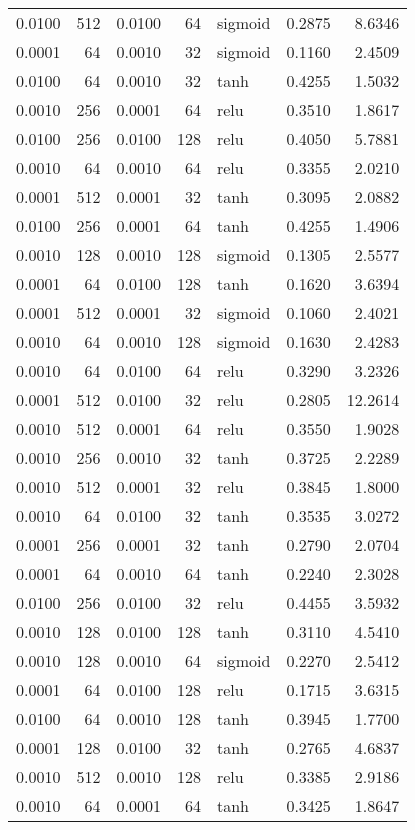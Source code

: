 \begin{table}
\begin{tabular}{rrrrlrr}
0.0100 & 512 & 0.0100 & 64 & sigmoid & 0.2875 & 8.6346 \\
0.0001 & 64 & 0.0010 & 32 & sigmoid & 0.1160 & 2.4509 \\
0.0100 & 64 & 0.0010 & 32 & tanh & 0.4255 & 1.5032 \\
0.0010 & 256 & 0.0001 & 64 & relu & 0.3510 & 1.8617 \\
0.0100 & 256 & 0.0100 & 128 & relu & 0.4050 & 5.7881 \\
0.0010 & 64 & 0.0010 & 64 & relu & 0.3355 & 2.0210 \\
0.0001 & 512 & 0.0001 & 32 & tanh & 0.3095 & 2.0882 \\
0.0100 & 256 & 0.0001 & 64 & tanh & 0.4255 & 1.4906 \\
0.0010 & 128 & 0.0010 & 128 & sigmoid & 0.1305 & 2.5577 \\
0.0001 & 64 & 0.0100 & 128 & tanh & 0.1620 & 3.6394 \\
0.0001 & 512 & 0.0001 & 32 & sigmoid & 0.1060 & 2.4021 \\
0.0010 & 64 & 0.0010 & 128 & sigmoid & 0.1630 & 2.4283 \\
0.0010 & 64 & 0.0100 & 64 & relu & 0.3290 & 3.2326 \\
0.0001 & 512 & 0.0100 & 32 & relu & 0.2805 & 12.2614 \\
0.0010 & 512 & 0.0001 & 64 & relu & 0.3550 & 1.9028 \\
0.0010 & 256 & 0.0010 & 32 & tanh & 0.3725 & 2.2289 \\
0.0010 & 512 & 0.0001 & 32 & relu & 0.3845 & 1.8000 \\
0.0010 & 64 & 0.0100 & 32 & tanh & 0.3535 & 3.0272 \\
0.0001 & 256 & 0.0001 & 32 & tanh & 0.2790 & 2.0704 \\
0.0001 & 64 & 0.0010 & 64 & tanh & 0.2240 & 2.3028 \\
0.0100 & 256 & 0.0100 & 32 & relu & 0.4455 & 3.5932 \\
0.0010 & 128 & 0.0100 & 128 & tanh & 0.3110 & 4.5410 \\
0.0010 & 128 & 0.0010 & 64 & sigmoid & 0.2270 & 2.5412 \\
0.0001 & 64 & 0.0100 & 128 & relu & 0.1715 & 3.6315 \\
0.0100 & 64 & 0.0010 & 128 & tanh & 0.3945 & 1.7700 \\
0.0001 & 128 & 0.0100 & 32 & tanh & 0.2765 & 4.6837 \\
0.0010 & 512 & 0.0010 & 128 & relu & 0.3385 & 2.9186 \\
0.0010 & 64 & 0.0001 & 64 & tanh & 0.3425 & 1.8647 \\

\end{tabular}
\end{table}
